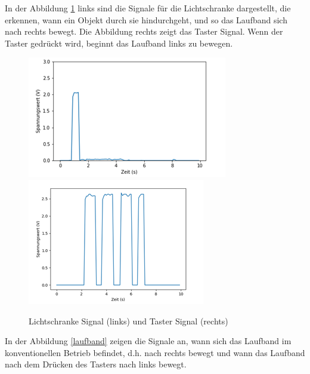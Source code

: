 \documentclass[12pt,a4paper]{scrartcl}
\numberwithin{equation}{section}
\begin{document}
In der Abbildung \ref{lichtschranke} links sind die Signale für die Lichtschranke dargestellt, die erkennen, wann ein Objekt durch sie hindurchgeht, und so das Laufband sich nach rechts bewegt. Die Abbildung rechts zeigt das Taster Signal. Wenn der Taster gedrückt wird, beginnt das Laufband links zu bewegen. 

\begin{figure}[ht!]
	\centering
	  \includegraphics[scale=0.75]{lichtschranke.png}
	  \includegraphics[scale=0.75]{taster.png}
	  \caption{Lichtschranke Signal (links) und Taster Signal (rechts)}
	  \label{lichtschranke}
\end{figure}

In der Abbildung \ref{laufband} zeigen die Signale an, wann sich das Laufband im konventionellen Betrieb befindet, d.h. nach rechts bewegt und wann das Laufband nach dem Drücken des Tasters nach links bewegt. 
\end{document}
